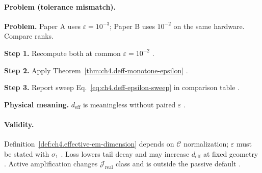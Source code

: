 \paragraph{Problem (tolerance mismatch).}
\textbf{Problem.} Paper A uses \(\varepsilon=10^{-3}\); Paper B uses \(10^{-2}\) on the same hardware. Compare ranks.

\textbf{Step 1.} Recompute both at common \(\varepsilon=10^{-2}\) \cite{hansen1988}.

\textbf{Step 2.} Apply Theorem~\ref{thm:ch4.deff-monotone-epsilon} \cite{harrington2001}.

\textbf{Step 3.} Report sweep Eq.~\eqref{eq:ch4.deff-epsilon-sweep} in comparison table \cite{stratton1941,devaney2004}.

\textbf{Physical meaning.} \(d_{\mathrm{eff}}\) is meaningless without paired \(\varepsilon\) \cite{hansen1988}.

\paragraph{Validity.}
Definition~\ref{def:ch4.effective-em-dimension} depends on \(\mathcal{C}\) normalization; \(\varepsilon\) must be stated with \(\sigma_{1}\)
\cite{hansen1988,stratton1941}. Loss lowers tail decay and may increase \(d_{\mathrm{eff}}\) at fixed geometry \cite{harrington2001}. Active
amplification changes \(\mathcal{J}_{\mathrm{real}}\) class and is outside the passive default \cite{stratton1941,devaney2004}.

